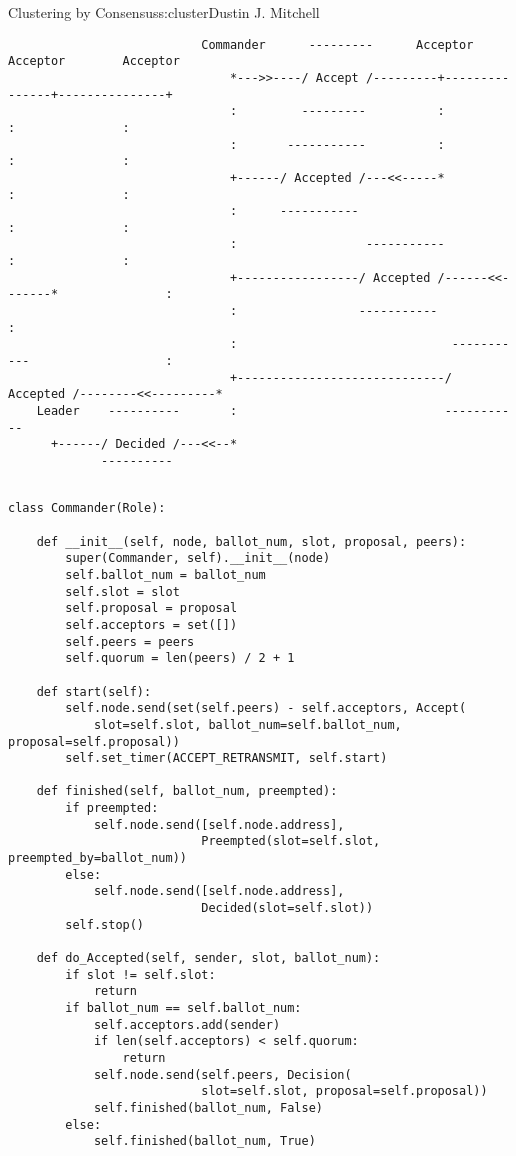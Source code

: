 \begin{aosachapter}{Clustering by Consensus}{s:cluster}{Dustin J. Mitchell}
\begin{verbatim}
                           Commander      ---------      Acceptor        Acceptor        Acceptor
                               *--->>----/ Accept /---------+---------------+---------------+
                               :         ---------          :               :               :
                               :       -----------          :               :               :
                               +------/ Accepted /---<<-----*               :               :
                               :      -----------                           :               :
                               :                  -----------               :               :
                               +-----------------/ Accepted /------<<-------*               :
                               :                 -----------                                :
                               :                              -----------                   :
                               +-----------------------------/ Accepted /--------<<---------*
    Leader    ----------       :                             -----------
      +------/ Decided /---<<--*
             ----------   
\end{verbatim}

\begin{verbatim}

class Commander(Role):

    def __init__(self, node, ballot_num, slot, proposal, peers):
        super(Commander, self).__init__(node)
        self.ballot_num = ballot_num
        self.slot = slot
        self.proposal = proposal
        self.acceptors = set([])
        self.peers = peers
        self.quorum = len(peers) / 2 + 1

    def start(self):
        self.node.send(set(self.peers) - self.acceptors, Accept(
            slot=self.slot, ballot_num=self.ballot_num, proposal=self.proposal))
        self.set_timer(ACCEPT_RETRANSMIT, self.start)

    def finished(self, ballot_num, preempted):
        if preempted:
            self.node.send([self.node.address], 
                           Preempted(slot=self.slot, preempted_by=ballot_num))
        else:
            self.node.send([self.node.address], 
                           Decided(slot=self.slot))
        self.stop()

    def do_Accepted(self, sender, slot, ballot_num):
        if slot != self.slot:
            return
        if ballot_num == self.ballot_num:
            self.acceptors.add(sender)
            if len(self.acceptors) < self.quorum:
                return
            self.node.send(self.peers, Decision(
                           slot=self.slot, proposal=self.proposal))
            self.finished(ballot_num, False)
        else:
            self.finished(ballot_num, True)
    

\end{verbatim}
\end{aosachapter}

